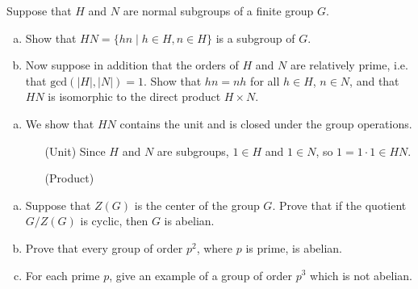 \documentclass{article}
\newcounter{Problem}
\newenvironment{Problem}{\begin{Exercise}[name={Problem},
                                          counter={Problem}]}
                        {\end{Exercise}}
\begin{document}
\pagebreak

\begin{Problem}
Suppose that $H$ and $N$ are normal subgroups of a finite group $G$.
\begin{enumerate}[(a)]
  \item{Show that $HN = \{ hn \mid h \in H, n \in H \}$ 
        is a subgroup of $G$.}
  \item{Now suppose in addition that the orders of $H$ and $N$ are
      relatively prime, i.e. that $\mathrm{gcd}(|H|,|N|) = 1$. Show
      that $hn = nh$ for all $h \in H$, $n \in N$, and that $HN$ is
      isomorphic to the direct product $H \times N$.}
\end{enumerate}
\end{Problem}

\begin{Answer}
\begin{enumerate}[(a)]
  \item{We show that $HN$ contains the unit and is closed under the
      group operations.
  \begin{itemize}
    \item[(Unit)]
    {
      Since $H$ and $N$ are subgroups, $1 \in H$ and $1 \in N$, so
      $1 = 1 \cdot 1 \in HN$.
    }
    \item[(Product)]
    {
    }
  \end{itemize}
  }
\end{enumerate}
\end{Answer}

\pagebreak

\begin{Problem}
\begin{enumerate}[(a)]
  \item{Suppose that $Z(G)$ is the center of the group $G$. Prove that if
      the quotient $G / Z(G)$ is cyclic, then $G$ is abelian.}
  \item{Prove that every group of order $p^2$, where $p$ is prime, is
      abelian.}
  \item{For each prime $p$, give an example of a group of order $p^3$
      which is not abelian.}
\end{enumerate}
\end{Problem}

\begin{Answer}
\end{Answer}
\end{document}
